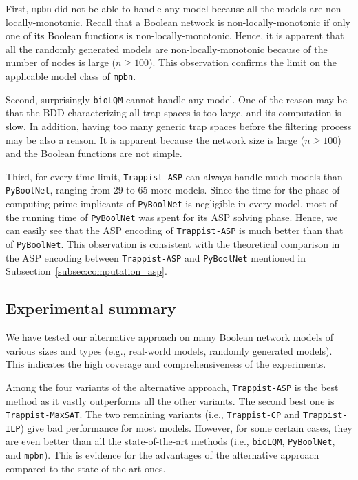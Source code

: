 \documentclass[preprint,12pt]{elsarticle}
\begin{document}
First, \texttt{mpbn} did not be able to handle any model because all the models are non-locally-monotonic.
Recall that a Boolean network is non-locally-monotonic if only one of its Boolean functions is non-locally-monotonic.
Hence, it is apparent that all the randomly generated models are non-locally-monotonic because of the number of nodes is large (\(n \geq 100\)).
This observation confirms the limit on the applicable model class of \texttt{mpbn}.

Second, surprisingly \texttt{bioLQM} cannot handle any model.
One of the reason may be that the BDD characterizing all trap spaces is too large, and its computation is slow.
In addition, having too many generic trap spaces before the filtering process may be also a reason.
It is apparent because the network size is large (\(n \geq 100\)) and the Boolean functions are not simple.

Third, for every time limit, \texttt{Trappist-ASP} can always handle much models than \texttt{PyBoolNet}, ranging from 29 to 65 more models.
Since the time for the phase of computing prime-implicants of \texttt{PyBoolNet} is negligible in every model, most of the running time of \texttt{PyBoolNet} was spent for its ASP solving phase.
Hence, we can easily see that the ASP encoding of \texttt{Trappist-ASP} is much better than that of \texttt{PyBoolNet}. 
This observation is consistent with the theoretical comparison in the ASP encoding between \texttt{Trappist-ASP} and \texttt{PyBoolNet} mentioned in Subsection~\ref{subsec:computation_asp}.


\subsection{Experimental summary}
\label{subsec:Experimental_summary}

We have tested our alternative approach on many Boolean network models of various sizes and types (e.g., real-world models, randomly generated models).
This indicates the high coverage and comprehensiveness of the experiments.

Among the four variants of the alternative approach, \texttt{Trappist-ASP} is the best method as it vastly outperforms all the other variants.
The second best one is \texttt{Trappist-MaxSAT}.
The two remaining variants (i.e., \texttt{Trappist-CP} and \texttt{Trappist-ILP}) give bad performance for most models.
However, for some certain cases, they are even better than all the state-of-the-art methods (i.e., \texttt{bioLQM}, \texttt{PyBoolNet}, and \texttt{mpbn}).
This is evidence for the advantages of the alternative approach compared to the state-of-the-art ones.
\end{document}
